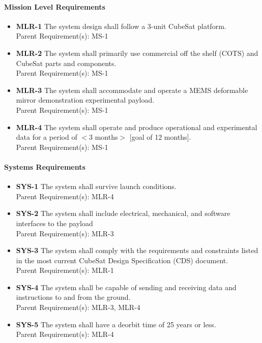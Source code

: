 \documentclass[12pt]{article}
\begin{document}
		\paragraph{Mission Level Requirements}
		\begin{itemize}
				\item \textbf{MLR-1} The system design shall follow a 3-unit CubeSat platform.\\
				Parent Requirement(s): MS-1
				\item \textbf{MLR-2} The system shall primarily use commercial off the shelf (COTS) and CubeSat parts and components.\\
				Parent Requirement(s): MS-1
				\item \textbf{MLR-3} The system shall accommodate and operate a MEMS deformable mirror demonstration experimental payload.\\
				Parent Requirement(s): MS-1
				\item \textbf{MLR-4} The system shall operate and produce operational and experimental data for a period of $<$3 months$>$ [goal of 12 months].\\
				Parent Requirement(s): MS-1
		\end{itemize}
		
		\paragraph{Systems Requirements}
		
		\begin{itemize}
			\item \textbf{SYS-1} The system shall survive launch conditions.\\
			Parent Requirement(s): MLR-4
			\item \textbf{SYS-2} The system shall include electrical, mechanical, and software interfaces to the payload\\
			Parent Requirement(s): MLR-3
			\item \textbf{SYS-3} The system shall comply with the requirements and constraints listed in the most current CubeSat Design Specification (CDS) document. \cite{mission_cubesat} \\
			Parent Requirement(s): MLR-1
			\item \textbf{SYS-4} The system shall be capable of sending and receiving data and instructions to and from the ground.\\
			Parent Requirement(s): MLR-3, MLR-4
			\item \textbf{SYS-5} The system shall have a deorbit time of 25 years or less. \cite{mission_deorbit}\\
			Parent Requirement(s): MLR-4
		\end{itemize}
\end{document}
